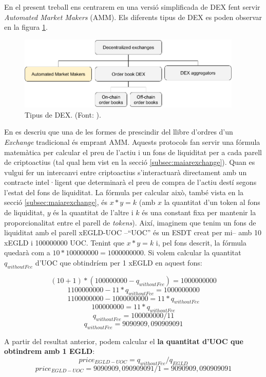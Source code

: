 \documentclass[11pt,a4paper]{article}
\begin{document}
En el present treball ens centrarem en una versió simplificada de DEX fent servir \textit{Automated Market Makers} (AMM). Els diferents tipus de DEX es poden observar en la figura \ref{fig:dextypes}.
\begin{figure}[h]
\includegraphics[width=0.95\textwidth]{DEXtypes.png}
\centering
\caption{Tipus de DEX. (Font: \cite{cointelegraph}).}\label{fig:dextypes}
\end{figure} 

En \cite{delarosa} es descriu que una de les formes de prescindir del llibre d'ordres d'un \textit{Exchange} tradicional és emprant AMM. Aquests protocols fan servir una fórmula matemàtica per calcular el preu de l'actiu i un fons de liquiditat per a cada parell de criptoactius (tal qual hem vist en la secció \ref{subsec:maiarexchange}). Quan es vulgui fer un intercanvi entre criptoactius s'interactuarà directament amb un contracte intel·ligent que determinarà el preu de compra de l'actiu destí segons l'estat del fons de liquiditat. La fórmula per calcular això, també vista en la secció \ref{subsec:maiarexchange}, és  \(x * y = k\) (amb \(x\) la quantitat d'un token al fons de liquiditat, \(y\) és la quantitat de l'altre i \(k\) és una constant fixa per mantenir la proporcionalitat entre el parell de \textit{tokens}). Així, imaginem que tenim un fons de liquiditat amb el parell xEGLD-UOC –``UOC'' és un ESDT creat per mi– amb 10 xEGLD i 100000000 UOC. Tenint que \(x * y = k\) i, pel fons descrit, la fórmula quedarà com a \(10 * 100000000 = 1000000000\). Si volem calcular la quantitat \(q_{withoutFee}\) d'UOC que obtindríem per 1 xEGLD en aquest fons:

$$ (10 + 1) * (100000000 - q_{withoutFee}) = 1000000000 $$
$$ 1100000000 - 11 * q_{withoutFee} = 1000000000 $$
$$ 1100000000 - 1000000000 = 11 * q_{withoutFee} $$
$$ 100000000 = 11 * q_{withoutFee} $$
$$ q_{withoutFee} = 100000000 / 11 $$
$$ q_{withoutFee} = 9090909,090909091 $$

A partir del resultat anterior, podem calcular el \textbf{la quantitat d'UOC que obtindrem amb 1 EGLD}:
$$ price_{EGLD-UOC} = q_{withoutFee} / q_{EGLD} $$
$$ price_{EGLD-UOC} = 9090909,090909091 / 1 = 9090909,090909091 $$
\end{document}
